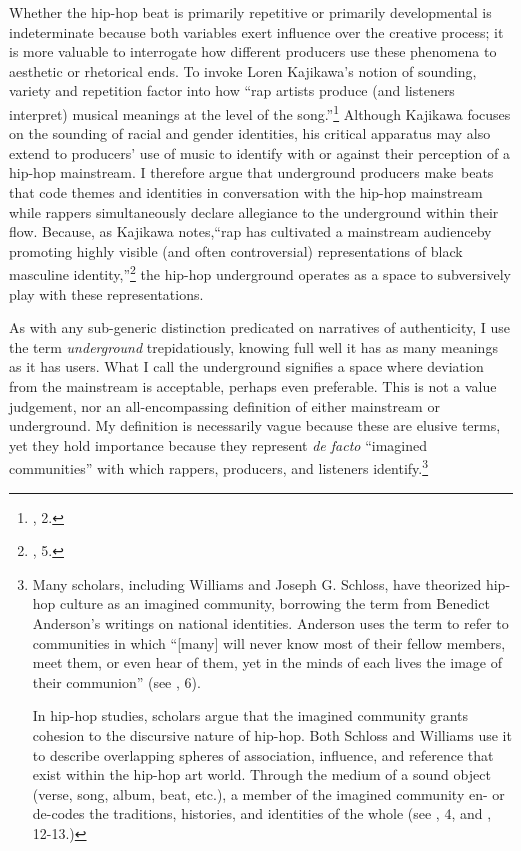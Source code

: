 Whether the hip-hop beat is primarily repetitive or primarily developmental is indeterminate because both variables exert influence over the creative process; it is more valuable to interrogate how different producers use these phenomena to aesthetic or rhetorical ends. To invoke Loren Kajikawa's notion of sounding, variety and repetition factor into how ``rap artists produce (and listeners interpret) musical meanings at the level of the song.''\footnote{\cite{lorenkajikawaSoundingRaceRap2015}, 2.} Although Kajikawa focuses on the sounding of racial and gender identities, his critical apparatus may also extend to producers' use of music to identify with or against their perception of a hip-hop mainstream. I therefore argue that underground producers make beats that code themes and identities in conversation with the hip-hop mainstream while rappers simultaneously declare allegiance to the underground within their flow. Because, as Kajikawa notes,``rap has cultivated a mainstream audience\textellipsis by promoting highly visible (and often controversial) representations of black masculine identity,''\footnote{\cite{lorenkajikawaSoundingRaceRap2015}, 5.} the hip-hop underground operates as a space to subversively play with these representations.

As with any sub-generic distinction predicated on narratives of authenticity, I use the term \emph{underground} trepidatiously, knowing full well it has as many meanings as it has users. What I call the underground signifies a space where deviation from the mainstream is acceptable, perhaps even preferable. This is not a value judgement, nor an all-encompassing definition of either mainstream or underground. My definition is necessarily vague because these are elusive terms, yet they hold importance because they represent \textit{de facto} ``imagined communities'' with which rappers, producers, and listeners identify.\footnote{Many scholars, including Williams and Joseph G. Schloss, have theorized hip-hop culture as an imagined community, borrowing the term from Benedict Anderson's writings on national identities. Anderson uses the term to refer to communities in which ``[many] will never know most of their fellow members, meet them, or even hear of them, yet in the minds of each lives the image of their communion'' (see \cite{benedictandersonImaginedCommunitiesReflections2006}, 6).

In hip-hop studies, scholars argue that the imagined community grants cohesion to the discursive nature of hip-hop. Both Schloss and Williams use it to describe overlapping spheres of association, influence, and reference that exist within the hip-hop art world. Through the medium of a sound object (verse, song, album, beat, etc.), a member of the imagined community en- or de-codes the traditions, histories, and identities of the whole (see \cite{josephgschlossMakingBeatsArt2004}, 4, and \cite{justinawilliamsRhyminStealinMusical2013}, 12-13.)}

